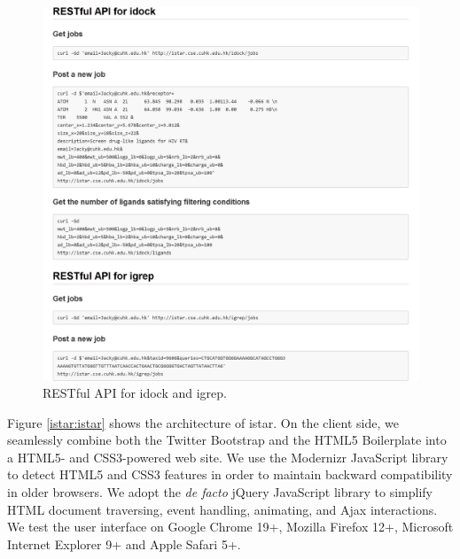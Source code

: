 \begin{figure}
\centering
\includegraphics[width=\linewidth]{istar/RESTfulAPI.png}
\caption{RESTful API for idock and igrep.}
\label{istar:RESTfulAPI}
\end{figure}

Figure \ref{istar:istar} shows the architecture of istar. On the client side, we seamlessly combine both the Twitter Bootstrap and the HTML5 Boilerplate into a HTML5- and CSS3-powered web site. We use the Modernizr JavaScript library to detect HTML5 and CSS3 features in order to maintain backward compatibility in older browsers. We adopt the \textit{de facto} jQuery JavaScript library to simplify HTML document traversing, event handling, animating, and Ajax interactions. We test the user interface on Google Chrome 19+, Mozilla Firefox 12+, Microsoft Internet Explorer 9+ and Apple Safari 5+.

